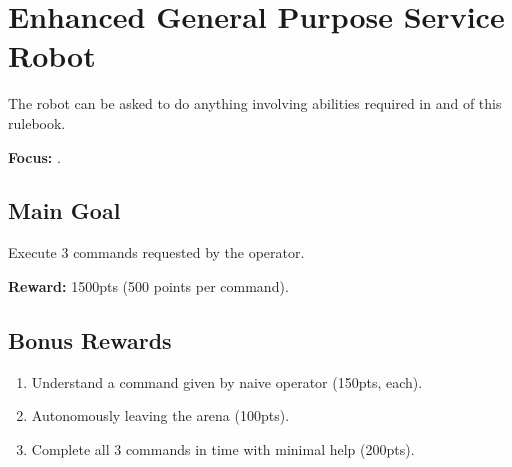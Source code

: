 \section{Enhanced General Purpose Service Robot}
\label{test:egpsr}
The robot can be asked to do anything involving abilities required in \SONE{} and \STWO{} of this rulebook.

\noindent \textbf{Focus:} \SysI{}.

\subsection*{Main Goal}
Execute 3 commands requested by the operator.

\noindent\textbf{Reward:} 1500pts (500 points per command).

\subsection*{Bonus Rewards}
\begin{enumerate}[nosep]
	\item Understand a command given by naive operator (150pts, each).
	\item Autonomously leaving the arena (100pts).
	\item Complete all 3 commands in time with minimal help (200pts).
\end{enumerate}

%
%
